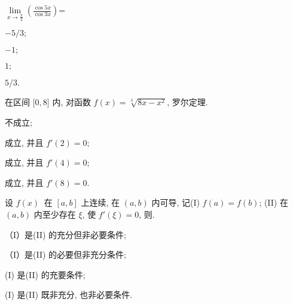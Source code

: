 \begin{problem}
$\displaystyle \lim\limits_{x \rightarrow \frac{\pi}{2}}\left( \frac{\cos 5x}{\cos 3x} \right)$=

\begin{abcd} \item $- 5/3;$

\item $- 1;$

\item $1;$

\item $5/3.$

\end{abcd}

\end{problem}

\begin{problem}
在区间 $\lbrack 0,8\rbrack$ 内, 对函数
$f\left( x \right) = \sqrt[3]{8x - x^{2}}$, 罗尔定理.

\begin{abcd} \item 不成立;

\item 成立, 并且 $f'\left( 2 \right) = 0;$

\item 成立, 并且 $f'\left( 4 \right) = 0;$

\item 成立, 并且 $f'\left( 8 \right) = 0$.

\end{abcd}

\end{problem}

\begin{problem}
设 $f(x)\ $ 在 $\left\lbrack a,b \right\rbrack$ 上连续, 在
$\left( a,b \right)$ 内可导, 记(I)
$f\left( a \right) = f\left( b \right)$; (II) 在 $\left( a,b \right)$
内至少存在 $\xi$, 使 $f'\left( \xi \right) = 0$, 则.

\begin{abcd} \item（I）是(II) 的充分但非必要条件;

\item（I）是(II) 的必要但非充分条件;

\item (I) 是(II) 的充要条件;

\item (I) 是(II) 既非充分, 也非必要条件.

\end{abcd}

\end{problem}

